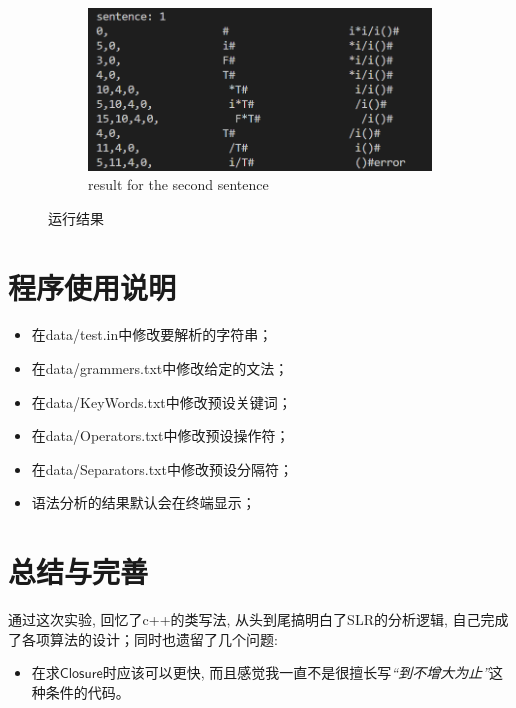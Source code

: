 \documentclass{zpt}
\begin{document}
\begin{figure}
        \begin{subfigure}[t]{0.45\textwidth}
            \includegraphics[width=\textwidth]{../resources/output2.png}
            \caption{result for the second sentence}
            \label{fig::output2}
        \end{subfigure}
        \caption{运行结果}
    \end{figure}
    \section{程序使用说明}
    \begin{itemize}
        \item 在data/test.in中修改要解析的字符串；
        \item 在data/grammers.txt中修改给定的文法；
        \item 在data/KeyWords.txt中修改预设关键词；
        \item 在data/Operators.txt中修改预设操作符；
        \item 在data/Separators.txt中修改预设分隔符；
        \item 语法分析的结果默认会在终端显示；
    \end{itemize}
    \section{总结与完善}
    通过这次实验, 回忆了c++的类写法, 从头到尾搞明白了SLR的分析逻辑, 自己完成了各项算法的设计；同时也遗留了几个问题:
    \begin{itemize}
        \item 在求$\mathsf{Closure}$时应该可以更快, 而且感觉我一直不是很擅长写\emph{“到不增大为止”}这种条件的代码。
    \end{itemize}
\end{document}
